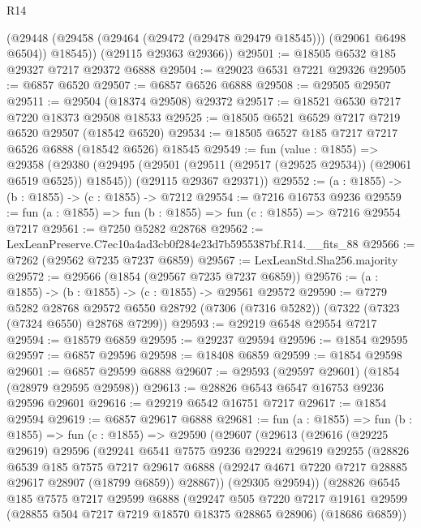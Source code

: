 \begin{lexlean}{R14}
\begin{coremodule}
        (@29448 (@29458 (@29464 (@29472 (@29478 @29479 @18545))) (@29061 @6498 @6504)) @18545))
      (@29115 @29363 @29366))
@29501 := @18505 @6532 @185 @29327 @7217 @29372 @6888
@29504 := @29023 @6531 @7221 @29326
@29505 := @6857 @6520
@29507 := @6857 @6526 @6888
@29508 := @29505 @29507
@29511 := @29504 (@18374 @29508) @29372
@29517 := @18521 @6530 @7217 @7220 @18373 @29508 @18533
@29525 := @18505 @6521 @6529 @7217 @7219 @6520 @29507 (@18542 @6520)
@29534 := @18505 @6527 @185 @7217 @7217 @6526 @6888 (@18542 @6526) @18545
@29549 := fun (value : @1855) =>
  @29358
    (@29380
      (@29495 (@29501 (@29511 (@29517 (@29525 @29534)) (@29061 @6519 @6525)) @18545))
      (@29115 @29367 @29371))
@29552 := (a : @1855) -> (b : @1855) -> (c : @1855) -> @7212
@29554 := @7216 @16753 @9236
@29559 := fun (a : @1855) => fun (b : @1855) => fun (c : @1855) => @7216 @29554 @7217
@29561 := @7250 @5282 @28768
@29562 := LexLeanPreserve.C7ec10a4ad3cb0f284e23d7b5955387bf.R14.__fits_88
@29566 := @7262 (@29562 @7235 @7237 @6859)
@29567 := LexLeanStd.Sha256.majority
@29572 := @29566 (@1854 (@29567 @7235 @7237 @6859))
@29576 := (a : @1855) -> (b : @1855) -> (c : @1855) -> @29561 @29572
@29590 := @7279
    @5282
    @28768
    @29572
    @6550
    @28792
    (@7306 (@7316 @5282))
    (@7322 (@7323 (@7324 @6550) @28768 @7299))
@29593 := @29219 @6548 @29554 @7217
@29594 := @18579 @6859
@29595 := @29237 @29594
@29596 := @1854 @29595
@29597 := @6857 @29596
@29598 := @18408 @6859
@29599 := @1854 @29598
@29601 := @6857 @29599 @6888
@29607 := @29593 (@29597 @29601) (@1854 (@28979 @29595 @29598))
@29613 := @28826 @6543 @6547 @16753 @9236 @29596 @29601
@29616 := @29219 @6542 @16751 @7217
@29617 := @1854 @29594
@29619 := @6857 @29617 @6888
@29681 := fun (a : @1855) =>
  fun (b : @1855) =>
  fun (c : @1855) =>
  @29590
    (@29607
      (@29613
        (@29616
          (@29225 @29619)
          @29596
          (@29241
            @6541
            @7575
            @9236
            @29224
            @29619
            @29255
            (@28826
              @6539
              @185
              @7575
              @7217
              @29617
              @6888
              (@29247 @4671 @7220 @7217 @28885 @29617 @28907 (@18799 @6859))
              @28867))
          (@29305 @29594))
        (@28826
          @6545
          @185
          @7575
          @7217
          @29599
          @6888
          (@29247
            @505
            @7220
            @7217
            @19161
            @29599
            (@28855 @504 @7217 @7219 @18570 @18375 @28865 @28906)
            (@18686 @6859))

\end{coremodule}
\end{lexlean}
